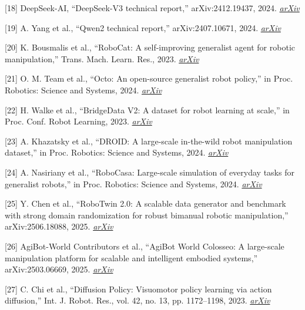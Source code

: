 {\protect\hypertarget{ref_18}{}{}{[}18{]} DeepSeek-AI, ``DeepSeek-V3
technical report,'' arXiv:2412.19437, 2024.
\href{https://arxiv.org/abs/2412.19437}{\emph{arXiv}}

\protect\hypertarget{ref_19}{}{}{[}19{]} A. Yang et al., ``Qwen2
technical report,'' arXiv:2407.10671, 2024.
\href{https://arxiv.org/abs/2407.10671}{\emph{arXiv}}

\protect\hypertarget{ref_20}{}{}{[}20{]} K. Bousmalis et al., ``RoboCat:
A self-improving generalist agent for robotic manipulation,'' Trans.
Mach. Learn. Res., 2023.
\href{https://arxiv.org/abs/2306.11706}{\emph{arXiv}}

\protect\hypertarget{ref_21}{}{}{[}21{]} O. M. Team et al., ``Octo: An
open-source generalist robot policy,'' in Proc. Robotics: Science and
Systems, 2024. \href{https://arxiv.org/abs/2405.12213}{\emph{arXiv}}

\protect\hypertarget{ref_22}{}{}{[}22{]} H. Walke et al., ``BridgeData
V2: A dataset for robot learning at scale,'' in Proc. Conf. Robot
Learning, 2023. \href{https://arxiv.org/abs/2308.12952}{\emph{arXiv}}

\protect\hypertarget{ref_23}{}{}{[}23{]} A. Khazatsky et al., ``DROID: A
large-scale in-the-wild robot manipulation dataset,'' in Proc. Robotics:
Science and Systems, 2024.
\href{https://arxiv.org/abs/2403.12945}{\emph{arXiv}}

\protect\hypertarget{ref_24}{}{}{[}24{]} A. Nasiriany et al.,
``RoboCasa: Large-scale simulation of everyday tasks for generalist
robots,'' in Proc. Robotics: Science and Systems, 2024.
\href{https://arxiv.org/abs/2406.02523}{\emph{arXiv}}

\protect\hypertarget{ref_25}{}{}{[}25{]} Y. Chen et al., ``RoboTwin 2.0:
A scalable data generator and benchmark with strong domain randomization
for robust bimanual robotic manipulation,'' arXiv:2506.18088, 2025.
\href{https://arxiv.org/abs/2506.18088}{\emph{arXiv}}

\protect\hypertarget{ref_26}{}{}{[}26{]} AgiBot-World Contributors et
al., ``AgiBot World Colosseo: A large-scale manipulation platform for
scalable and intelligent embodied systems,'' arXiv:2503.06669, 2025.
\href{https://arxiv.org/abs/2503.06669}{\emph{arXiv}}

\protect\hypertarget{ref_27}{}{}{[}27{]} C. Chi et al., ``Diffusion
Policy: Visuomotor policy learning via action diffusion,'' Int. J.
Robot. Res., vol. 42, no. 13, pp. 1172--1198, 2023.
\href{https://arxiv.org/abs/2303.04137}{\emph{arXiv}}

}
